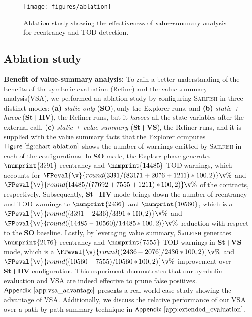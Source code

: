 \documentclass[conference, romanappendices]{tex/IEEEtran}
\theoremstyle{bfnote}
\newcommand{\toolname}{\textsc{Sailfish}\xspace}
\newcommand{\explore}{{\sc Explore}\xspace}
\newcommand{\explorer}{{\sc Explorer}\xspace}
\newcommand{\refine}{{\sc Refine}\xspace}
\newcommand{\refiner}{{\sc Refiner}\xspace}
\newcommand{\reentrancy}{{reentrancy}\xspace}
\newcommand{\vsa}{{value-summary analysis}\xspace}
\let\num\numprint
\newcommand{\Fig}[1]{\ensuremath{\sf Figure~\ref{#1}}}
\newcommand{\Appen}[1]{\ensuremath{\sf Appendix~\ref{#1}}}
\newcommand{\clintSafeDAO}{83171}
\newcommand{\clintUnsafeDAO}{2076}
\newcommand{\clintSafeTOD}{77692}
\newcommand{\clintUnsafeTOD}{7555}
\newcommand{\clintTimeout}{1211}
\newcommand{\clintStaticOnlyDAO}{3391}
\newcommand{\clintStaticOnlyTOD}{14485}
\newcommand{\clintHavocDAO}{2436}
\newcommand{\clintHavocTOD}{10560}
\begin{document}
\begin{figure}[!t]
	\vspace{-4mm}
	\centering
	\texttt{[image: figures/ablation]}
	\vspace{-3.5mm}
	\caption{\small Ablation study showing the effectiveness of \vsa for \reentrancy and TOD detection.
	}
	\label{fig:chart-ablation}
	\vspace{-7mm}
\end{figure}

\subsection{Ablation study}
\label{sec:ablation}
\noindent
\textbf{Benefit of \vsa:}
To gain a better understanding of the benefits of the symbolic evaluation (\refine) and the \vsa (VSA), we performed an ablation study by configuring \toolname{} in three distinct modes:
\textbf{(a)} \textit{static-only} (\textbf{SO}), only the \explorer runs, and \textbf{(b)} \textit{static + havoc} (\textbf{St+HV}), the \refiner{} runs, but it \textit{havocs} all the state variables after the external call. 
\textbf{(c)} \textit{static + value summary} (\textbf{St+VS}), the \refiner{} runs, and it is supplied with the value summary facts that the \explorer computes.
\Fig{fig:chart-ablation} shows the number of warnings emitted by \toolname{} in each of the configurations.
In \textbf{SO} mode, the \explore phase generates $\num{\clintStaticOnlyDAO}$ \reentrancy and $\num{\clintStaticOnlyTOD}$ TOD warnings, which accounts for $\FPeval{\v}{round(\clintStaticOnlyDAO/(\clintSafeDAO+\clintUnsafeDAO+\clintTimeout)*100,2)}\v\%$ and $\FPeval{\v}{round(\clintStaticOnlyTOD/(\clintSafeTOD+\clintUnsafeTOD+\clintTimeout)*100,2)}\v\%$ of the contracts, respectively.
Subsequently, \textbf{St+HV} mode brings down the number of \reentrancy and TOD warnings to $\num{\clintHavocDAO}$ and $\num{\clintHavocTOD}$, which is a $\FPeval{\v}{round((\clintStaticOnlyDAO-\clintHavocDAO)/\clintStaticOnlyDAO*100,2)}\v\%$ and $\FPeval{\v}{round((\clintStaticOnlyTOD-\clintHavocTOD)/\clintStaticOnlyTOD*100,2)}\v\%$ reduction with respect to the \textbf{SO} baseline. 
Lastly, by leveraging value summary, \toolname{} generates $\num{\clintUnsafeDAO}$ \reentrancy and $\num{\clintUnsafeTOD}$ TOD warnings in \textbf{St+VS} mode, which is a $\FPeval{\v}{round((\clintHavocDAO-\clintUnsafeDAO)/\clintHavocDAO*100,2)}\v\%$ and $\FPeval{\v}{round((\clintHavocTOD-\clintUnsafeTOD)/\clintHavocTOD*100,2)}\v\%$ improvement over \textbf{St+HV} configuration.
This experiment demonstrates that our symbolic evaluation and VSA are indeed effective to prune false positives.
\Appen{app:vsa_advantage} presents a real-world case study showing the advantage of VSA.
Additionally, we discuss the relative performance of our VSA over a path-by-path summary technique in \Appen{app:extended_evaluation}.
\end{document}
